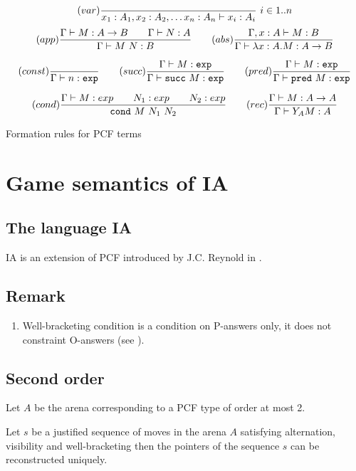 \begin{table}[htbp]
$$ (var) \frac{\displaystyle }{x_1:A_1, x_2:A_2, \ldots x_n : A_n  \vdash x_i : A_i}\ i \in 1..n$$
$$ (app) \frac{\displaystyle \Gamma \vdash M : A\rightarrow B \qquad \Gamma \vdash N:A}{\Gamma \vdash M\ N : B}
\qquad (abs) \frac{\displaystyle \Gamma, x:A \vdash M : B}{\Gamma \vdash \lambda x :A . M : A\rightarrow B}$$

$$ (const) \frac{\displaystyle }{\Gamma \vdash n :\texttt{exp}}
\qquad (succ) \frac{\displaystyle \Gamma \vdash M:\texttt{exp} }{\Gamma \vdash \texttt{succ}\ M:\texttt{exp}}
\qquad (pred) \frac{\displaystyle \Gamma \vdash M:\texttt{exp} }{\Gamma \vdash \texttt{pred}\ M:\texttt{exp}}$$

$$
(cond) \frac{\displaystyle \Gamma \vdash M : exp \qquad N_1 : exp \qquad N_2 : exp }{\texttt{cond}\ M\ N_1\ N_2}
\qquad  (rec) \frac{\displaystyle \Gamma \vdash M : A\rightarrow A }{ \Gamma \vdash Y_A M : A}$$

\caption{Formation rules for PCF terms}
\label{tab:pcf_formrules}
\end{table}



\section{Game semantics of IA}
\subsection{The language IA}
IA is an extension of PCF introduced by J.C. Reynold in
\cite{Reynolds81}.

\subsection{Remark}

\begin{enumerate}
\item
Well-bracketing condition is a condition on P-answers only, it does
not constraint O-answers (see \cite{abramsky:game-semantics}).

\end{enumerate}


\subsection{Second order}

\begin{lem}
Let $A$ be the arena corresponding to a PCF type of order at most 2.

Let $s$ be a justified sequence of moves in the arena $A$ satisfying
 alternation, visibility and well-bracketing then
the pointers of the sequence $s$ can be reconstructed uniquely.
\end{lem}



